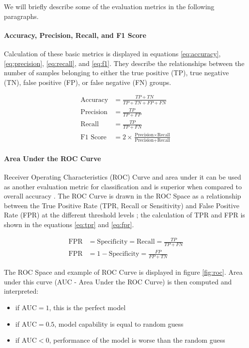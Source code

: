 We will briefly describe some of the evaluation metrics in the following paragraphs. 

\paragraph{Accuracy, Precision, Recall, and F1 Score} Calculation of these basic metrics is displayed in equations \ref{eq:accuracy}, \ref{eq:precision}, \ref{eq:recall}, and \ref{eq:f1}. They describe the relationships between the number of samples belonging to either the true positive (TP), true negative (TN), false positive (FP), or false negative (FN) groups.

\begin{align}
\label{eq:accuracy}
\text{Accuracy} &= \frac{TP + TN}{TP + TN + FP + FN} \\
\label{eq:precision}
\text{Precision} &= \frac{TP}{TP + FP} \\
\label{eq:recall}
\text{Recall} &= \frac{TP}{TP + FN} \\
\label{eq:f1}
\text{F1\ Score} &= 2 \times \frac{\text{Precision} \times \text{Recall}}{\text{Precision} + \text{Recall}}
\end{align}

\paragraph{Area Under the ROC Curve}
Receiver Operating Characteristics (ROC) Curve and area under it can be used as another evaluation metric for classification and is superior when compared to overall accuracy \cite{Bradley1997}. The ROC Curve is drawn in the ROC Space as a relationship between the True Positive Rate (TPR, Recall or Sensitivity) and False Positive Rate (FPR) at the different threshold levels \cite{Bradley1997, Nahm2022, Fawcett2006}; the calculation of TPR and FPR is shown in the equations \ref{eq:tpr} and \ref{eq:fpr}.

\begin{align}
\label{eq:tpr}
\text{FPR} &=\text{Specificity} = \text{Recall} = \frac{TP}{TP + FN} \\
\label{eq:fpr}
\text{FPR} &= 1-\text{Specificity} = \frac{FP}{FP + TN}
\end{align}

The ROC Space and example of ROC Curve is displayed in figure \ref{fig:roc}. Area under this curve (AUC - Area Under the ROC Curve) is then computed and interpreted:

\begin{itemize}
    \item if $\text{AUC} = 1$, this is the perfect model
    \item if $\text{AUC} = 0.5$, model capability is equal to random guess
    \item if $\text{AUC} < 0$, performance of the model is worse than the random guess
\end{itemize}

